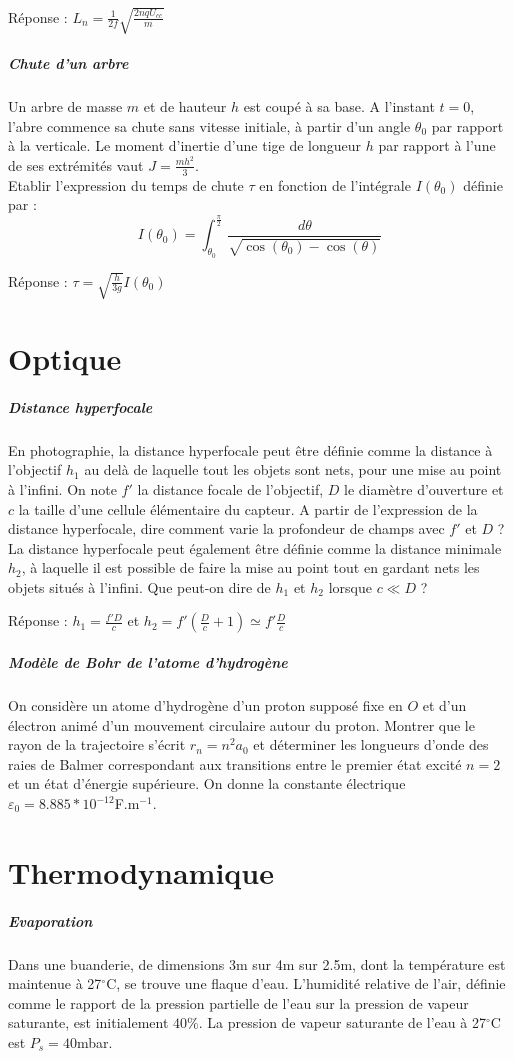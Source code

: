 \documentclass[a4paper, 11pt, french]{article}
\newcommand{\ep}{\varepsilon}
\newcommand{\inv}[1]{\frac{1}{#1}}
\begin{document}
	Réponse : $L_n=\inv{2f}\sqrt{\frac{2nqU_{cc}}{m}}$

	\subparagraph*{Chute d'un arbre \\}
		Un arbre de masse $m$ et de hauteur $h$ est coupé à sa base. A l'instant $t=0$, l'abre commence sa chute sans vitesse initiale, à partir d'un angle $\theta_0$ par rapport à la verticale. Le moment d'inertie d'une tige de longueur $h$ par rapport à l'une de ses extrémités vaut $J=\frac{mh^2}{3}$. \\
Etablir l'expression du temps de chute $\tau$ en fonction de l'intégrale $I(\theta_0)$ définie par : $$I(\theta_0)=\int_{\theta_0}^{\frac{\pi}{2}}\frac{d\theta}{\sqrt{\cos(\theta_0)-\cos(\theta)}}$$


	Réponse : $\tau=\sqrt{\frac{h}{3g}}I(\theta_0)$


	\section*{Optique}
	\subparagraph*{Distance hyperfocale \\}
		En photographie, la distance hyperfocale peut être définie comme la distance à l'objectif $h_1$ au delà de laquelle tout les objets sont nets, pour une mise au point à l'infini. On note $f'$ la distance focale de l'objectif, $D$ le diamètre d'ouverture et $c$ la taille d'une cellule élémentaire du capteur. A partir de l'expression de la distance hyperfocale, dire comment varie la profondeur de champs avec $f'$ et $D$ ? La distance hyperfocale peut également être définie comme la distance minimale $h_2$, à laquelle il est possible de faire la mise au point tout en gardant nets les objets situés à l'infini. Que peut-on dire de $h_1$ et $h_2$ lorsque $c \ll D$ ?


	Réponse : $h_1=\frac{f'D}{c}$ et $h_2=f' \left( \frac{D}{c}+1 \right) \simeq f'\frac{D}{c}$

	\subparagraph*{Modèle de Bohr de l'atome d'hydrogène \\}
		On considère un atome d'hydrogène d'un proton supposé fixe en $O$ et d'un électron animé d'un mouvement circulaire autour du proton. Montrer que le rayon de la trajectoire s'écrit $r_n=n^2a_0$ et déterminer les longueurs d'onde des raies de Balmer correspondant aux transitions entre le premier état excité $n=2$ et un état d'énergie supérieure. On donne la constante électrique $\ep_0=8.885*10^{-12}$F.m$^{-1}$.

	\section*{Thermodynamique}
	\subparagraph*{Evaporation \\}
		Dans une buanderie, de dimensions 3m sur 4m sur 2.5m, dont la température est maintenue à 27$^{\circ}$C, se trouve une flaque d'eau. L'humidité relative de l'air, définie comme le rapport de la pression partielle de l'eau sur la pression de vapeur saturante, est initialement $40\%$. La pression de vapeur saturante de l'eau à 27$^{\circ}$C est $P_s=40$mbar.
\end{document}
